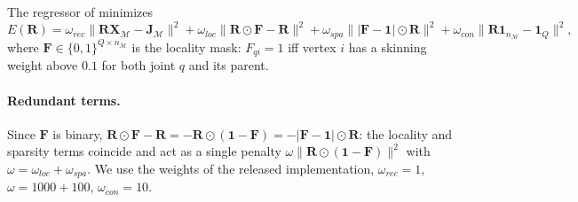 \documentclass[11pt]{article}
\newcommand{\M}{\mathcal{M}}
\newcommand{\Rspat}{\mathbf{R}}
\newcommand{\X}{\mathbf{X}}
\newcommand{\J}{\mathbf{J}}
\newcommand{\F}{\mathbf{F}}
\newcommand{\one}{\mathbf{1}}
\begin{document}
The regressor of \citet{musoni2021functional} minimizes
\begin{equation}
  E(\Rspat) = \omega_{rec} \|\Rspat\X_\M - \J_\M\|^2
            + \omega_{loc} \|\Rspat \odot \F - \Rspat\|^2
            + \omega_{spa} \| |\F - \one| \odot \Rspat\|^2
            + \omega_{con} \|\Rspat \one_{n_\M} - \one_Q\|^2 ,
  \label{eq:regressor_energy}
\end{equation}
where $\F \in \{0,1\}^{Q \times n_\M}$ is the locality mask: $F_{qi}=1$ iff
vertex $i$ has a skinning weight above $0.1$ for both joint $q$ and its parent.

\paragraph{Redundant terms.} Since $\F$ is binary,
$\Rspat\odot\F - \Rspat = -\Rspat \odot (\one - \F) = -|\F - \one| \odot \Rspat$:
the locality and sparsity terms coincide and act as a single penalty
$\omega \|\Rspat \odot (\one - \F)\|^2$ with $\omega = \omega_{loc} + \omega_{spa}$.
We use the weights of the released implementation, $\omega_{rec} = 1$,
$\omega = 1000 + 100$, $\omega_{con} = 10$.
\end{document}
